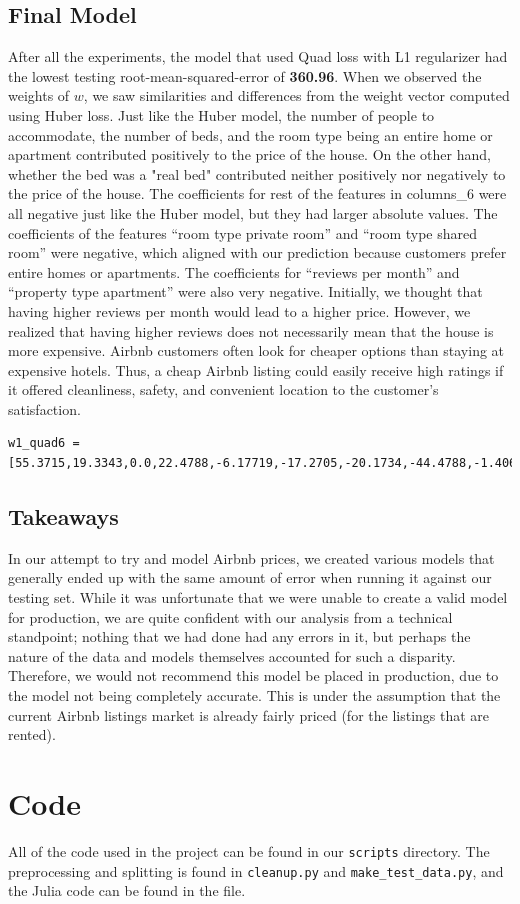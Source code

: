\documentclass{article}
\begin{document}
\subsection{Final Model}
After all the experiments, the model that used Quad loss with L1 regularizer had the lowest testing root-mean-squared-error of \textbf{360.96}. When we observed the weights of $w$, we saw similarities and differences from the weight vector computed using Huber loss. Just like the Huber model, the number of people to accommodate, the number of beds, and the room type being an entire home or apartment contributed positively to the price of the house. On the other hand, whether the bed was a "real bed" contributed neither positively nor negatively to the price of the house. The coefficients for rest of the features in columns\_6 were all negative just like the Huber model, but they had larger absolute values. The coefficients of the features ``room type private room'' and ``room type shared room'' were negative, which aligned with our prediction because customers prefer entire homes or apartments. The coefficients for ``reviews per month'' and ``property type apartment'' were also very negative. Initially, we thought that having higher reviews per month would lead to a higher price. However, we realized that having higher reviews does not necessarily mean that the house is more expensive. Airbnb customers often look for cheaper options than staying at expensive hotels. Thus, a cheap Airbnb listing could easily receive high ratings if it offered cleanliness, safety, and convenient location to the customer's satisfaction.

\begin{verbatim}
w1_quad6 = [55.3715,19.3343,0.0,22.4788,-6.17719,-17.2705,-20.1734,-44.4788,-1.4063]
\end{verbatim}

\subsection{Takeaways}
In our attempt to try and model Airbnb prices, we created various models that generally ended up with the same amount of error when running it against our testing set. While it was unfortunate that we were unable to create a valid model for production, we are quite confident with our analysis from a technical standpoint; nothing that we had done had any errors in it, but perhaps the nature of the data and models themselves accounted for such a disparity. Therefore, we would not recommend this model be placed in production, due to the model not being completely accurate. This is under the assumption that the current Airbnb listings market is already fairly priced (for the listings that are rented).

\section{Code}

All of the code used in the project can be found in our \texttt{scripts} directory. The preprocessing and splitting is found in \texttt{cleanup.py} and \texttt{make\_test\_data.py}, and the Julia code can be found in the  file.
\end{document}
